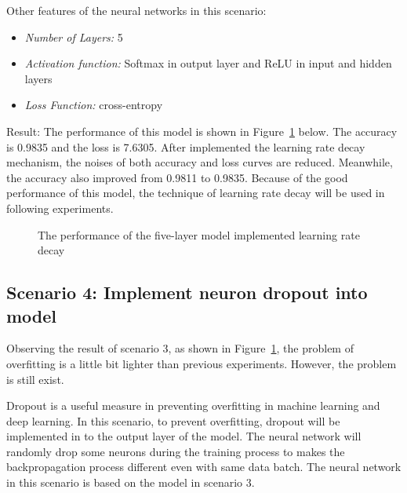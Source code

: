 \documentclass[]{UCD_CS_FYP_Report}
\begin{document}
Other features of the neural networks in this scenario:
\begin{itemize}
\item {\sl Number of Layers:} 5
\item {\sl Activation function:} Softmax in output layer and ReLU in input and hidden layers
\item {\sl Loss Function:} cross-entropy
\end{itemize} 
Result: The performance of this model is shown in Figure~\ref{fig:MNIST_fully_connected_S3E1} below. The accuracy is 0.9835 and the loss is 7.6305. After implemented the learning rate decay mechanism, the noises of both accuracy and loss curves are reduced. Meanwhile, the accuracy also improved from 0.9811 to 0.9835. Because of the good performance of this model, the technique of learning rate decay will be used in following experiments. 
\begin{figure}[h]
\centering
\fboxsep 2mm
\caption{\label{fig:MNIST_fully_connected_S3E1} The performance of the five-layer model implemented learning rate decay}
\end{figure}
\subsection{Scenario 4: Implement neuron dropout into model}
Observing the result of scenario 3, as shown in Figure~\ref{fig:MNIST_fully_connected_S3E1}, the problem of overfitting is a little bit lighter than previous experiments. However, the problem is still exist.

Dropout is a useful measure in preventing overfitting in machine learning and deep learning. In this scenario, to prevent overfitting, dropout will be implemented in to the output layer of the model. The neural network will randomly drop some neurons during the training process to makes the backpropagation process different even with same data batch. The neural network in this scenario is based on the model in scenario 3.
\end{document}
